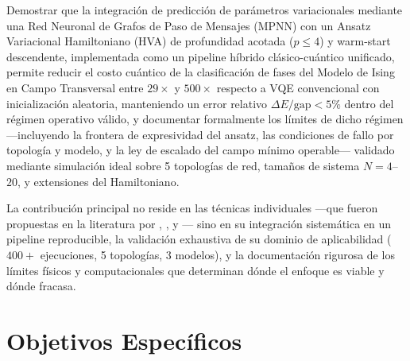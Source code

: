 \documentclass[11pt,a4paper,spanish]{book}
\begin{document}
Demostrar que la integración de predicción de parámetros variacionales mediante una Red Neuronal de Grafos de Paso de Mensajes (MPNN) con un Ansatz Variacional Hamiltoniano (HVA) de profundidad acotada ($p \leq 4$) y warm-start descendente, implementada como un pipeline híbrido clásico-cuántico unificado, permite reducir el costo cuántico de la clasificación de fases del Modelo de Ising en Campo Transversal entre $29\times$ y $500\times$ respecto a VQE convencional con inicialización aleatoria, manteniendo un error relativo $\Delta E/\text{gap} < 5\%$ dentro del régimen operativo válido, y documentar formalmente los límites de dicho régimen ---incluyendo la frontera de expresividad del ansatz, las condiciones de fallo por topología y modelo, y la ley de escalado del campo mínimo operable--- validado mediante simulación ideal sobre 5 topologías de red, tamaños de sistema $N = 4$--$20$, y extensiones del Hamiltoniano.

La contribución principal no reside en las técnicas individuales ---que fueron propuestas en la literatura por \citet{miao2024}, \citet{zhang2025}, \citet{wiersema2020} y \citet{puig2025}--- sino en su integración sistemática en un pipeline reproducible, la validación exhaustiva de su dominio de aplicabilidad ($400+$ ejecuciones, 5 topologías, 3 modelos), y la documentación rigurosa de los límites físicos y computacionales que determinan dónde el enfoque es viable y dónde fracasa.

\section{Objetivos Específicos}
\end{document}
